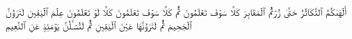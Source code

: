 أَلۡهَىٰكُمُ ٱلتَّكَاثُرُ
حَتَّىٰ زُرۡتُمُ ٱلۡمَقَابِرَ
كَلَّا سَوۡفَ تَعۡلَمُونَ
ثُمَّ كَلَّا سَوۡفَ تَعۡلَمُونَ
كَلَّا لَوۡ تَعۡلَمُونَ عِلۡمَ ٱلۡيَقِينِ
لَتَرَوُنَّ ٱلۡجَحِيمَ
ثُمَّ لَتَرَوُنَّهَا عَيۡنَ ٱلۡيَقِينِ
ثُمَّ لَتُسۡـَٔلُنَّ يَوۡمَئِذٍ عَنِ ٱلنَّعِيمِ